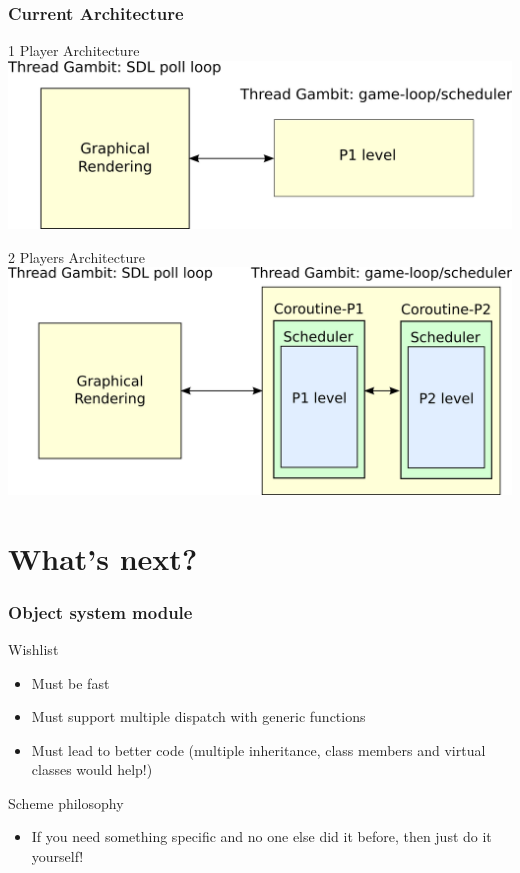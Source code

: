 \documentclass{beamer}
\newcommand{\<}[1]{\`#1}
\begin{document}
\begin{frame}
  \frametitle{Current Architecture}
  \begin{block}{1 Player Architecture}
    \includegraphics[scale=0.5]{arch-recent-1p}
  \end{block}

  \begin{block}{2 Players Architecture}
    \includegraphics[scale=0.5]{arch-recent-2p}
  \end{block}
\end{frame}



\section{What's next?}

\begin{frame}
  \frametitle{Object system module}

  \begin{block}{Wishlist}
    \begin{itemize}
    \item Must be \alert{fast}
    \item Must support multiple dispatch with generic functions
    \item Must lead to better code (multiple inheritance, class
      members and virtual classes would help!)
    \end{itemize}
  \end{block}

  \begin{block}{Scheme philosophy}
    \begin{itemize}
    \item If you need something specific and no one else did it
      before, then just do it yourself!
    \end{itemize}
  \end{block}
\end{frame}
\end{document}
